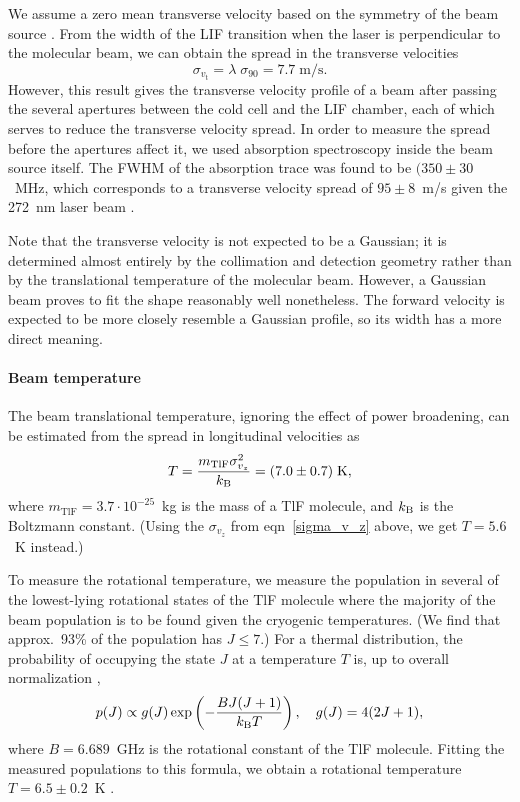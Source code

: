 We assume a zero mean transverse velocity based on the symmetry of the beam
source \cite[p.~114]{timgren2023thesis}. From the width of the \gls{LIF}
transition when the laser is perpendicular to the molecular beam, we can obtain
the spread in the transverse velocities \cite[eqn~5.24]{timgren2023thesis}
%
\[
    \sigma_{v_\text{t}}
    =\lambda\;\sigma_{90}
    =7.7\;\text{m/s}.
\]
%
However, this result gives the transverse velocity profile of a beam after
passing the several apertures between the cold cell and the \gls{LIF} chamber,
each of which serves to reduce the transverse velocity spread. In order to
measure the spread before the apertures affect it, we used absorption
spectroscopy inside the beam source itself. The FWHM of the absorption trace was
found to be $(350\pm30$~MHz, which corresponds to a transverse velocity spread
of $95\pm8$~m/s given the 272~nm laser beam \cite[sect~5.3.2]{timgren2023thesis}.

Note that the transverse velocity is not expected to be a Gaussian; it is
determined almost entirely by the collimation and detection geometry rather than
by the translational temperature of the molecular beam. However, a Gaussian beam
proves to fit the shape reasonably well nonetheless. The forward velocity is
expected to be more closely resemble a Gaussian profile, so its width has a more
direct meaning.

\paragraph{Beam temperature}

The beam translational temperature, ignoring the effect of power broadening, can
be estimated from the spread in longitudinal velocities as
\cite[eqn~5.35]{timgren2023thesis}
%
\[
    T=\frac{m_\text{TlF}\sigma^2_{v_z}}{k_\text{B}}=(7.0\pm0.7)\;\text{K},
\]
%
where $m_\text{TlF}=3.7\cdot10^{-25}$~kg is the mass of a TlF molecule, and
$k_\text{B}$ is the Boltzmann constant. (Using the $\sigma_{v_z}$ from
eqn~\ref{sigma_v_z} above, we get $T=5.6$~K instead.)

To measure the rotational temperature, we measure the population in several
of the lowest-lying rotational states of the TlF molecule where the majority of
the beam population is to be found given the cryogenic temperatures. (We find
that approx.\ 93\% of the population has $J\leq7$.) For a thermal distribution,
the probability of occupying the state $J$ at a temperature $T$ is, up to overall
normalization \cite[eqn~5.42]{timgren2023thesis},
%
\[
    p(J)\propto g(J)\exp\left(-\frac{BJ(J+1)}{k_\text{B} T}\right),
    \quad
    g(J)=4(2J+1),
\]
%
where $B=6.689$~GHz is the rotational constant of the TlF molecule. Fitting the
measured populations to this formula, we obtain a rotational temperature
$T=6.5\pm0.2$~K \cite[5.4]{timgren2023thesis}.

